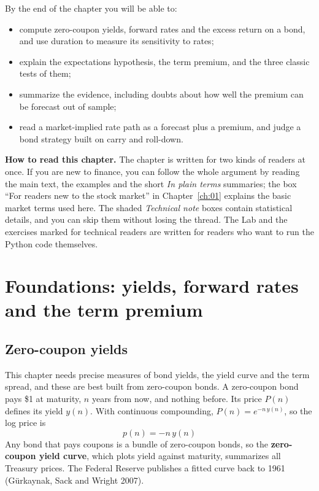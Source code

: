 By the end of the chapter you will be able to:

\begin{itemize}
  \item compute zero-coupon yields, forward rates and the excess return on a bond, and use duration to measure its sensitivity to rates;
  \item explain the expectations hypothesis, the term premium, and the three classic tests of them;
  \item summarize the evidence, including doubts about how well the premium can be forecast out of sample;
  \item read a market-implied rate path as a forecast plus a premium, and judge a bond strategy built on carry and roll-down.
\end{itemize}

\begin{callout}
\textbf{How to read this chapter.} The chapter is written for two kinds of readers at once. If you are new to finance, you can follow the whole argument by reading the main text, the examples and the short \emph{In plain terms} summaries; the box ``For readers new to the stock market'' in Chapter~\ref{ch:01} explains the basic market terms used here. The shaded \emph{Technical note} boxes contain statistical details, and you can skip them without losing the thread. The Lab and the exercises marked for technical readers are written for readers who want to run the Python code themselves.
\end{callout}

\section{Foundations: yields, forward rates and the term premium}
\label{sec:07-foundations}

\subsection{Zero-coupon yields}

This chapter needs precise measures of bond yields, the yield curve and the term spread, and these are best built from zero-coupon bonds. A zero-coupon bond pays \$1 at maturity, $n$ years from now, and nothing before. Its price $P(n)$ defines its yield $y(n)$. With continuous compounding, $P(n) = e^{-n\,y(n)}$, so the log price is
\begin{equation}
  p(n) = -n\,y(n)
  \label{eq:07-logprice}
\end{equation}
Any bond that pays coupons is a bundle of zero-coupon bonds, so the \textbf{zero-coupon yield curve}, which plots yield against maturity, summarizes all Treasury prices. The Federal Reserve publishes a fitted curve back to 1961 (G\"urkaynak, Sack and Wright 2007).


